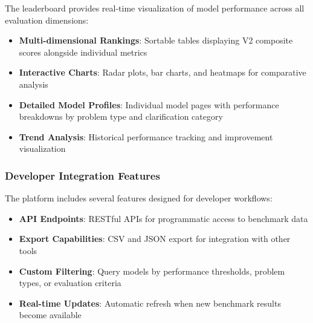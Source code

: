 \documentclass[conference]{IEEEtran}
\begin{document}
The leaderboard provides real-time visualization of model performance across all evaluation dimensions:

\begin{itemize}
    \item \textbf{Multi-dimensional Rankings}: Sortable tables displaying V2 composite scores alongside individual metrics
    \item \textbf{Interactive Charts}: Radar plots, bar charts, and heatmaps for comparative analysis
    \item \textbf{Detailed Model Profiles}: Individual model pages with performance breakdowns by problem type and clarification category
    \item \textbf{Trend Analysis}: Historical performance tracking and improvement visualization
\end{itemize}





\subsubsection{Developer Integration Features}

The platform includes several features designed for developer workflows:

\begin{itemize}
    \item \textbf{API Endpoints}: RESTful APIs for programmatic access to benchmark data
    \item \textbf{Export Capabilities}: CSV and JSON export for integration with other tools
    \item \textbf{Custom Filtering}: Query models by performance thresholds, problem types, or evaluation criteria
    \item \textbf{Real-time Updates}: Automatic refresh when new benchmark results become available
\end{itemize}
\end{document}
